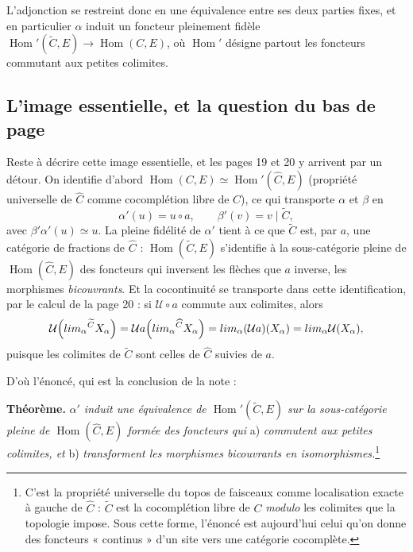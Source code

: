 \documentclass[11pt,a4paper]{article}
\begin{document}
L'adjonction se restreint donc en une équivalence entre ses deux parties fixes,
et en particulier $\alpha$ induit un foncteur pleinement fidèle
$\operatorname{Hom}'(\widetilde{C}, E) \to \operatorname{Hom}(C, E)$, où
$\operatorname{Hom}'$ désigne partout les foncteurs commutant aux petites
colimites.

\subsection*{L'image essentielle, et la question du bas de page}

Reste à décrire cette image essentielle, et les pages 19 et 20 y arrivent par
un détour. On identifie d'abord
$\operatorname{Hom}(C, E) \simeq \operatorname{Hom}'(\widehat{C}, E)$
(propriété universelle de $\widehat{C}$ comme cocomplétion libre de $C$), ce qui
transporte $\alpha$ et $\beta$ en
\[
\alpha'(u) = u \circ a, \qquad \beta'(v) = v \mid \widetilde{C},
\]
avec $\beta'\alpha'(u) \simeq u$. La pleine fidélité de $\alpha'$ tient à ce
que $\widetilde{C}$ est, par $a$, une catégorie de fractions de
$\widehat{C}$ : $\operatorname{Hom}(\widetilde{C}, E)$ s'identifie à la
sous-catégorie pleine de $\operatorname{Hom}(\widehat{C}, E)$ des foncteurs qui
inversent les flèches que $a$ inverse, les morphismes \emph{bicouvrants}. Et
la cocontinuité se transporte dans cette identification, par le calcul de la
page 20 : si $\mathcal{U} \circ a$ commute aux colimites, alors
\[
\mathcal{U}\Bigl(\varinjlim_{\alpha}{}^{\widetilde{C}} X_{\alpha}\Bigr)
= \mathcal{U}a\Bigl(\varinjlim_{\alpha}{}^{\widehat{C}} X_{\alpha}\Bigr)
= \varinjlim_{\alpha} (\mathcal{U}a)(X_{\alpha})
= \varinjlim_{\alpha} \mathcal{U}(X_{\alpha}),
\]
puisque les colimites de $\widetilde{C}$ sont celles de $\widehat{C}$ suivies
de $a$.

D'où l'énoncé, qui est la conclusion de la note :

\textbf{Théorème.} \emph{$\alpha'$ induit une équivalence de
$\operatorname{Hom}'(\widetilde{C}, E)$ sur la sous-catégorie pleine de
$\operatorname{Hom}(\widehat{C}, E)$ formée des foncteurs qui} a) \emph{commutent
aux petites colimites, et} b) \emph{transforment les morphismes bicouvrants en
isomorphismes.}\footnote{C'est la propriété universelle du topos de faisceaux
comme localisation exacte à gauche de $\widehat{C}$ : $\widetilde{C}$ est la
cocomplétion libre de $C$ \emph{modulo} les colimites que la topologie
impose. Sous cette forme, l'énoncé est aujourd'hui celui qu'on donne des
foncteurs « continus » d'un site vers une catégorie cocomplète.}
\end{document}
